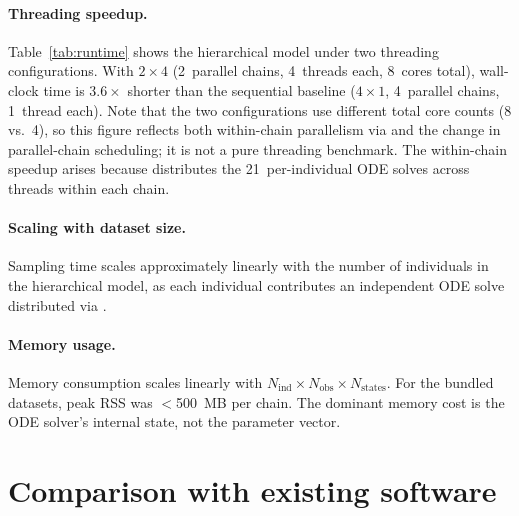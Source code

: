 \documentclass[article,shortnames]{jss}
\begin{document}

\paragraph{Threading speedup.}
Table~\ref{tab:runtime} shows the hierarchical model under two
threading configurations.  With $2 \times 4$ (2~parallel chains,
4~threads each, 8~cores total), wall-clock time is $3.6\times$
shorter than the sequential baseline ($4 \times 1$, 4~parallel
chains, 1~thread each).  Note that the two configurations use
different total core counts (8 vs.\ 4), so this figure reflects
both within-chain parallelism via  and the
change in parallel-chain scheduling; it is not a pure threading
benchmark.  The within-chain speedup arises because
 distributes the 21~per-individual ODE solves
across threads within each chain.

\paragraph{Scaling with dataset size.}
Sampling time scales approximately linearly with the number of
individuals in the hierarchical model, as each individual contributes
an independent ODE solve distributed via .

\paragraph{Memory usage.}
Memory consumption scales linearly with $N_{\mathrm{ind}} \times
N_{\mathrm{obs}} \times N_{\mathrm{states}}$.  For the bundled
datasets, peak RSS was $<$500~MB per chain.  The dominant memory cost
is the ODE solver's internal state, not the  parameter
vector.


\section{Comparison with existing software} \label{sec:comparison}
\end{document}
